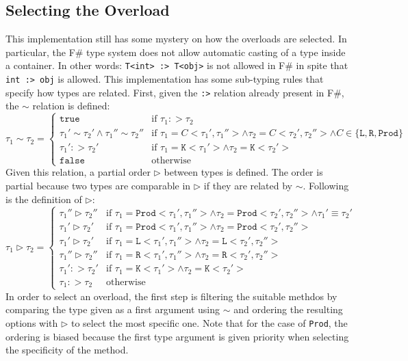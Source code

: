 \documentclass[8pt]{extarticle}
\begin{document}
\subsection{Selecting the Overload}
This implementation still has some mystery on how the overloads are selected. In particular, the F\# type system does not allow automatic casting of a type inside a container. In other words: \verb+T<int> :> T<obj>+ is not allowed in F\# in spite that \verb+int :> obj+ is allowed. This implementation has some sub-typing rules that specify how types are related. First, given the \verb+:>+ relation already present in F\#, the $\sim$ relation is defined:
\[
\tau_1 \sim \tau_2 =
\left\{
\begin{array}{ll}
  \mathtt{true} & \mbox{if } \tau_1 :> \tau_2 \\
  \tau_1' \sim \tau_2' \wedge \tau_1'' \sim \tau_2'' & \mbox{if } \tau_1 = \mathit{C}<\tau_1',\tau_1''> \wedge \tau_2 = \mathit{C}<\tau_2',\tau_2''> \wedge \mathit{C} \in \{\mathtt{L},\mathtt{R},\mathtt{Prod}\}\\
  \tau_1' :> \tau_2' & \mbox{if } \tau_1 = \mathtt{K}<\tau_1'> \wedge \tau_2 = \mathtt{K}<\tau_2'>\\
  \mathtt{false} & \mbox{otherwise}
\end{array}
\right.
\]
Given this relation, a partial order $\rhd$ between types is defined. The order is partial because two types are comparable in $\rhd$ if they are related by $\sim$. Following is the definition of $\rhd$:
\[
\tau_1 \rhd \tau_2 =
\left\{
\begin{array}{ll}
  \tau_1'' \rhd \tau_2'' & \mbox{if } \tau_1=\mathtt{Prod}<\tau_1',\tau_1''> \wedge \tau_2=\mathtt{Prod}<\tau_2',\tau_2''> \wedge \tau_1'\equiv\tau_2'\\
  \tau_1' \rhd \tau_2' & \mbox{if } \tau_1=\mathtt{Prod}<\tau_1',\tau_1''> \wedge \tau_2=\mathtt{Prod}<\tau_2',\tau_2''> \\
  \tau_1' \rhd \tau_2' & \mbox{if } \tau_1=\mathtt{L}<\tau_1',\tau_1''> \wedge \tau_2=\mathtt{L}<\tau_2',\tau_2''> \\
  \tau_1'' \rhd \tau_2'' & \mbox{if } \tau_1=\mathtt{R}<\tau_1',\tau_1''> \wedge \tau_2=\mathtt{R}<\tau_2',\tau_2''> \\
  \tau_1' :> \tau_2' & \mbox{if } \tau_1=\mathtt{K}<\tau_1'> \wedge \tau_2=\mathtt{K}<\tau_2'> \\
  \tau_1 :> \tau_2 & \mbox{otherwise}
\end{array}
\right.
\]
In order to select an overload, the first step is filtering the suitable methdos by comparing the type given as a first argument using $\sim$ and ordering the resulting options with $\rhd$ to select the most specific one. Note that for the case of \verb+Prod+, the ordering is biased because the first type argument is given priority when selecting the specificity of the method.
\end{document}

